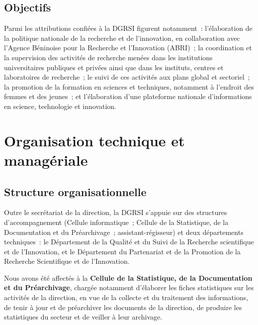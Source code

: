 \subsection{Objectifs}

Parmi les attributions confi\'ees \`a la DGRSI figurent notamment~: l'\'elaboration
de la politique nationale de la recherche et de l'innovation, en collaboration
avec l'Agence B\'eninoise pour la Recherche et l'Innovation (ABRI)~; la
coordination et la supervision des activit\'es de recherche men\'ees dans les
institutions universitaires publiques et priv\'ees ainsi que dans les instituts,
centres et laboratoires de recherche~; le suivi de ces activit\'es aux plans
global et sectoriel~; la promotion de la formation en sciences et techniques,
notamment \`a l'endroit des femmes et des jeunes~; et l'\'elaboration d'une
plateforme nationale d'informations en science, technologie et innovation.

\section{Organisation technique et manag\'eriale}

\subsection{Structure organisationnelle}

Outre le secr\'etariat de la direction, la DGRSI s'appuie sur des structures
d'accompagnement (Cellule informatique~; Cellule de la Statistique, de la
Documentation et du Pr\'earchivage~; assistant-r\'egisseur) et deux d\'epartements
techniques~: le D\'epartement de la Qualit\'e et du Suivi de la Recherche
scientifique et de l'Innovation, et le D\'epartement du Partenariat et de la
Promotion de la Recherche Scientifique et de l'Innovation.

Nous avons \'et\'e affect\'es \`a la \textbf{Cellule de la Statistique, de la
Documentation et du Pr\'earchivage}, charg\'ee notamment d'\'elaborer les fiches
statistiques sur les activit\'es de la direction, en vue de la collecte et du
traitement des informations, de tenir \`a jour et de pr\'earchiver les documents
de la direction, de produire les statistiques du secteur et de veiller \`a leur
archivage.


